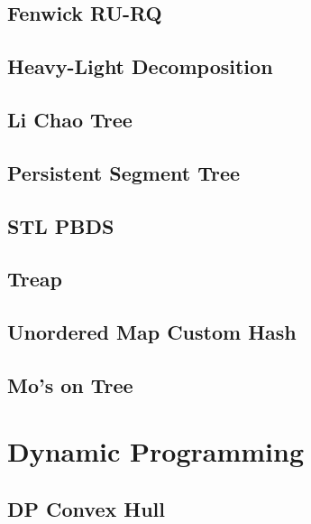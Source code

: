\subsection{Fenwick RU-RQ}

\subsection{Heavy-Light Decomposition}

\subsection{Li Chao Tree}

\subsection{Persistent Segment Tree}

\subsection{STL PBDS}

\subsection{Treap}

\subsection{Unordered Map Custom Hash}

\subsection{Mo's on Tree}

\section{Dynamic Programming}
\subsection{DP Convex Hull}

